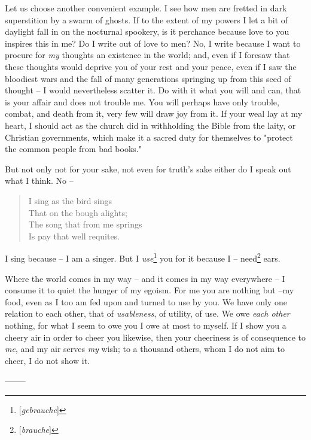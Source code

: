 Let us choose another convenient example. I see how men are fretted in dark 
superstition by a swarm of ghosts. If to the extent of my powers I let a bit 
of daylight fall in on the nocturnal spookery, is it perchance because love to 
you inspires this in me? Do I write out of love to men? No, I write because I 
want to procure for \textit{my} thoughts an existence in the world; and, even 
if I foresaw that these thoughts would deprive you of your rest and your 
peace, even if I saw the bloodiest wars and the fall of many generations 
springing up from this seed of thought -- I would nevertheless scatter it. Do 
with it what you will and can, that is your affair and does not trouble me. 
You will perhaps have only trouble, combat, and death from it, very few will 
draw joy from it. If your weal lay at my heart, I should act as the church did 
in withholding the Bible from the laity, or Christian governments, which make 
it a sacred duty for themselves to "{}protect the common people from bad 
books."{}

But not only not for your sake, not even for truth's sake either do I speak 
out what I think. No --

\begin{quotation}

\noindent{}I sing as the bird sings\\
 That on the bough alights;\\
 The song that from me springs\\
 Is pay that well requites.\end{quotation}

\noindent{}I sing because -- I am a singer. But I 
\textit{use}\footnote{[\textit{gebrauche}]} you for it because I -- 
need\footnote{[\textit{brauche}]} ears.

Where the world comes in my way -- and it comes in my way everywhere -- I 
consume it to quiet the hunger of my egoism. For me you are nothing but --my 
food, even as I too am fed upon and turned to use by you. We have only one 
relation to each other, that of \textit{usableness}, of utility, of use. We 
owe \textit{each other} nothing, for what I seem to owe you I owe at most to 
myself. If I show you a cheery air in order to cheer you likewise, then your 
cheeriness is of consequence to \textit{me}, and my air serves \textit{my} 
wish; to a thousand others, whom I do not aim to cheer, I do not show it.

\begin{center}
--------\end{center}


